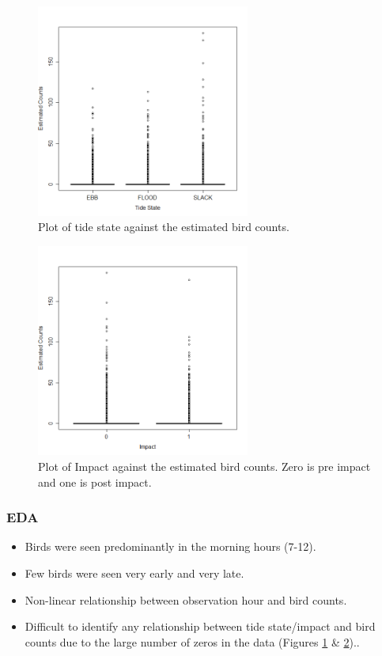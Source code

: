 \begin{frame}
\begin{figure}[h!]
  \centering
  \includegraphics[width=7cm]{bc/floodebb.png}
\caption{Plot of tide state against the estimated bird counts.}
\label{fig:nsexploratory2}
\end{figure}
\end{frame}
\begin{frame}
\begin{figure}[h!]
  \centering
  \includegraphics[width=7cm]{bc/impact.png}
\caption{Plot of Impact against the estimated bird counts. Zero is pre impact and one is post impact.}
\label{fig:nsexploratory3}
\end{figure}
\end{frame}


\begin{frame}
\frametitle{EDA}
\begin{itemize}
\item Birds were seen predominantly in the morning hours (7-12).
\item Few birds were seen very early and very late.  
\item Non-linear relationship between observation hour and bird counts.  
\item Difficult to identify any relationship between tide state/impact and bird counts due to the large number of zeros in the data (Figures \ref{fig:nsexploratory2} \&  \ref{fig:nsexploratory3})..
\end{itemize}
\end{frame}
\clearpage
